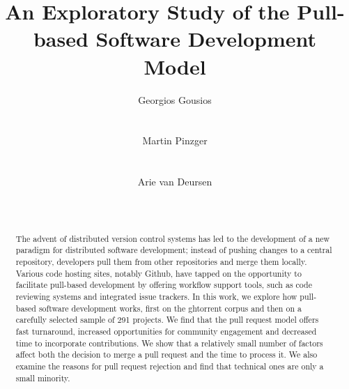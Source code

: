 \documentclass{sig-alternate}
\begin{document}
\newcommand{\todo}[1]{\textbf{TODO}\footnote{\textbf{TODO:} #1}}

\newcommand{\ghtorrent}{ \textsc{ght}orrent\xspace}
\newcommand{\api}{\textsc{api}\xspace}

\title{An Exploratory Study of the Pull-based Software Development Model}

\author{
\alignauthor
Georgios Gousios\\
       \\
       \\
\alignauthor
Martin Pinzger\\
       \\
       \\
\alignauthor
Arie van Deursen\\
       \\
       \\       
}

\maketitle

\begin{abstract}

  The advent of distributed version control systems has led to the development
  of a new paradigm for distributed software development; instead of pushing
  changes to a central repository, developers pull them from other repositories
  and merge them locally. Various code hosting sites, notably Github, have
  tapped on the opportunity to facilitate pull-based development by offering
  workflow support tools, such as code reviewing systems and integrated issue
  trackers. In this work, we explore how pull-based software development works,
  first on the {\sc ght}orrent corpus and then on a carefully selected sample of 291
  projects. We find that the pull request model offers fast turnaround,
  increased opportunities for community engagement and decreased
  time to incorporate contributions. We show that a relatively
  small number of factors affect both the decision to merge a pull request and
  the time to process it. We also examine the reasons for pull request
  rejection and find that technical ones are only a small minority.

\end{abstract}
\end{document}
